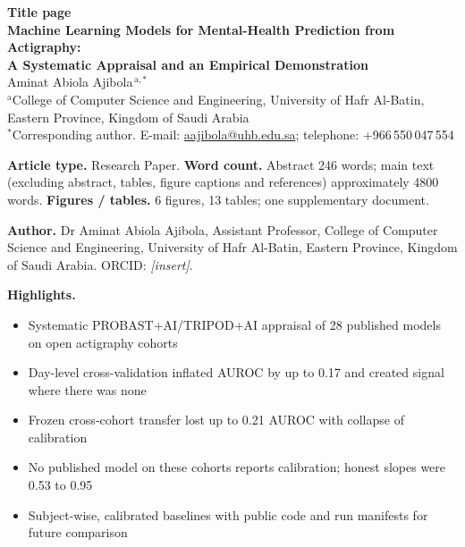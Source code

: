 \documentclass[11pt,a4paper]{article}
\begin{document}
\begin{center}
{\large\bfseries Title page}\\[1.2em]
{\LARGE\bfseries Machine Learning Models for Mental-Health Prediction from Actigraphy:\\[0.2em] A Systematic Appraisal and an Empirical Demonstration}\\[1.6em]
{\large Aminat Abiola Ajibola$^{\,\mathrm{a},*}$}\\[0.8em]
{\small $^{\mathrm{a}}$College of Computer Science and Engineering, University of Hafr Al-Batin, Eastern Province, Kingdom of Saudi Arabia}\\[0.3em]
{\small $^{*}$Corresponding author. E-mail: \href{mailto:aajibola@uhb.edu.sa}{aajibola@uhb.edu.sa}; telephone: +966\,550\,047\,554}
\end{center}
\vspace{0.8em}

\textbf{Article type.} Research Paper. \quad \textbf{Word count.} Abstract 246 words; main text (excluding abstract, tables, figure captions and references) approximately 4800 words. \quad \textbf{Figures / tables.} 6 figures, 13 tables; one supplementary document.

\textbf{Author.} Dr Aminat Abiola Ajibola, Assistant Professor, College of Computer Science and Engineering, University of Hafr Al-Batin, Eastern Province, Kingdom of Saudi Arabia. ORCID: \textit{[insert]}.

\textbf{Highlights.}
\begin{itemize}[nosep,leftmargin=1.4em]
\item Systematic PROBAST+AI/TRIPOD+AI appraisal of 28 published models on open actigraphy cohorts
\item Day-level cross-validation inflated AUROC by up to 0.17 and created signal where there was none
\item Frozen cross-cohort transfer lost up to 0.21 AUROC with collapse of calibration
\item No published model on these cohorts reports calibration; honest slopes were 0.53 to 0.95
\item Subject-wise, calibrated baselines with public code and run manifests for future comparison
\end{itemize}
\end{document}
